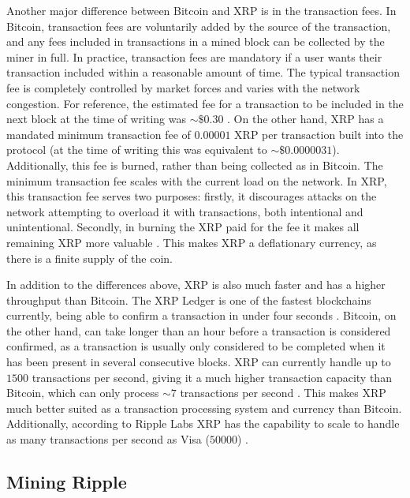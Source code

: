 \documentclass[11pt,a4paper]{article}
\begin{document}
	Another major difference between Bitcoin and XRP is in the transaction fees. In Bitcoin, transaction fees are voluntarily added by the source of the transaction, and any fees included in transactions in a mined block can be collected by the miner in full. In practice, transaction fees are mandatory if a user wants their transaction included within a reasonable amount of time. The typical transaction fee is completely controlled by market forces and varies with the network congestion. For reference, the estimated fee for a transaction to be included in the next block at the time of writing was $\sim\$0.30$ \cite{bitcoinfees}. On the other hand, XRP has a mandated minimum transaction fee of $0.00001$ XRP per transaction built into the protocol (at the time of writing this was equivalent to $\sim\$0.0000031$). Additionally, this fee is burned, rather than being collected as in Bitcoin. The minimum transaction fee scales with the current load on the network. In XRP, this transaction fee serves two purposes: firstly, it discourages attacks on the network attempting to overload it with transactions, both intentional and unintentional. Secondly, in burning the XRP paid for the fee it makes all remaining XRP more valuable \cite{transactioncost}. This makes XRP a deflationary currency, as there is a finite supply of the coin.
	
	In addition to the differences above, XRP is also much faster and has a higher throughput than Bitcoin. The XRP Ledger is one of the fastest blockchains currently, being able to confirm a transaction in under four seconds \cite{investinblockchain}. Bitcoin, on the other hand, can take longer than an hour before a transaction is considered confirmed, as a transaction is usually only considered to be completed when it has been present in several consecutive blocks. XRP can currently handle up to $1500$ transactions per second, giving it a much higher transaction capacity than Bitcoin, which can only process $\sim7$ transactions per second \cite{blocksplain}. This makes XRP much better suited as a transaction processing system and currency than Bitcoin. Additionally, according to Ripple Labs XRP has the capability to scale to handle as many transactions per second as Visa ($50000$) \cite{ripple}.
	
	\subsection{Mining Ripple}
	
\end{document}
